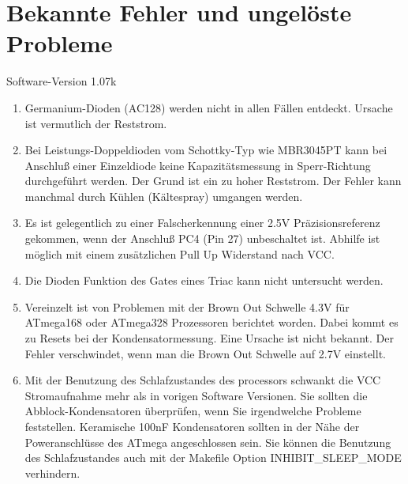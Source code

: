 
\chapter{Bekannte Fehler und ungelöste Probleme}
{\center Software-Version 1.07k}

\begin{enumerate}

\item Germanium-Dioden (AC128) werden nicht in allen Fällen entdeckt. Ursache ist vermutlich der Reststrom.

\item Bei Leistungs-Doppeldioden vom Schottky-Typ wie MBR3045PT kann bei Anschluß einer Einzeldiode keine Kapazitätsmessung in Sperr-Richtung 
durchgeführt werden. Der Grund ist ein zu hoher Reststrom. Der Fehler kann manchmal durch Kühlen (Kältespray) umgangen werden.

\item Es ist gelegentlich zu einer Falscherkennung einer 2.5V Präzisionsreferenz gekommen, wenn der Anschluß PC4 (Pin 27) unbeschaltet ist.
Abhilfe ist möglich mit einem zusätzlichen Pull Up Widerstand nach VCC.

\item Die Dioden Funktion des Gates eines Triac kann nicht untersucht werden.

\item Vereinzelt ist von Problemen mit der Brown Out Schwelle 4.3V für ATmega168 oder ATmega328 Prozessoren berichtet worden.
Dabei kommt es zu Resets bei der Kondensatormessung.  Eine Ursache ist nicht bekannt.
Der Fehler verschwindet, wenn man die Brown Out Schwelle auf 2.7V einstellt.

\item Mit der Benutzung des Schlafzustandes des processors schwankt die VCC Stromaufnahme mehr als
in vorigen Software Versionen. Sie sollten die Abblock-Kondensatoren überprüfen, wenn Sie irgendwelche
Probleme feststellen. Keramische 100nF Kondensatoren sollten in der Nähe der Poweranschlüsse des ATmega
angeschlossen sein. Sie können die Benutzung des Schlafzustandes auch mit der Makefile Option
INHIBIT\_SLEEP\_MODE verhindern.

\end{enumerate}
